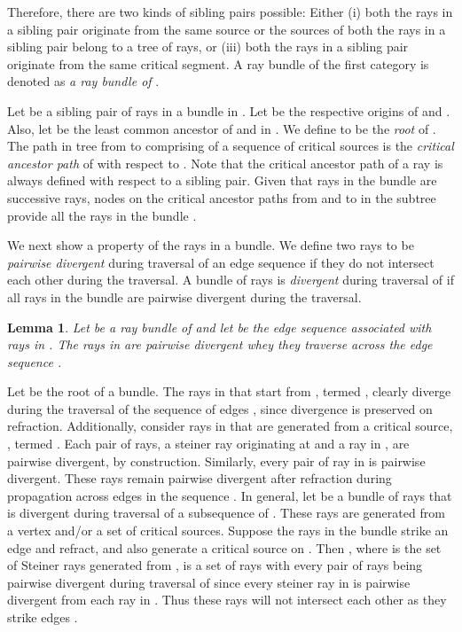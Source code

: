 \documentclass[11pt]{article}
\newtheorem{lemma}{Lemma}[section]
\newenvironment{proof}{\par\noindent{\bf Proof:}}{\mbox{}\hfill\\}
\begin{document}
Therefore, there are two  kinds of sibling pairs possible:
Either (i) both the rays in a sibling pair originate from the same source or the
 sources of both the rays in a sibling pair belong to a tree of rays,  or
(iii) both the rays in a sibling pair originate from the same critical segment.
A ray bundle of the first category is denoted as {\it a ray bundle of }. 


Let  be a sibling pair of  rays in a bundle  in .
Let  be the respective origins of  and . 
Also, let  be the least common ancestor of  and  in .
We define  to be the {\em root} of .
The path  in tree  from  to  comprising of a  sequence of critical sources is the {\it critical ancestor path} of  with respect to .  
Note that the critical ancestor path of a ray is always defined with respect to a sibling pair.
Given that rays in the bundle  are successive rays,
nodes on the critical ancestor paths from  and  to 
in the subtree  provide all the rays in the bundle .

We next show a property of the rays in a bundle. We define two rays to be {\em pairwise divergent} during traversal of an edge sequence
 if they do not intersect each other during the traversal. A bundle of rays is {\em divergent} during traversal of 
if all rays in the bundle are pairwise divergent during the traversal.

\begin{lemma}
Let  be a ray bundle of  and let  be the edge sequence associated with rays in .
The rays in  are pairwise divergent whey they traverse across the edge sequence .
\end{lemma}
\begin{proof}
Let  be the root of a bundle. The rays in  that start from , termed , clearly diverge during the  traversal of  the sequence of edges , since divergence is preserved on refraction. Additionally, consider
rays in  that are generated from a critical source, , termed . Each pair of rays, a steiner ray  originating at  and a ray in , are pairwise divergent, by construction.
Similarly, every pair of ray in  is pairwise divergent.
These rays remain pairwise divergent  after refraction during propagation across edges in the sequence .
In general, let  be  a bundle of
rays that is divergent during traversal of a subsequence of . These rays are  generated from a vertex and/or  a set of critical sources. Suppose the
rays in the bundle  strike an edge  and refract, and also generate
a critical source  on . Then , where  is the set of Steiner rays generated from ,
is a set of rays with every pair of rays being pairwise divergent during traversal of  since  every  steiner ray in
 is pairwise divergent from each ray in .
Thus these rays will not intersect each other as they strike edges .
\end{proof}
\end{document}
